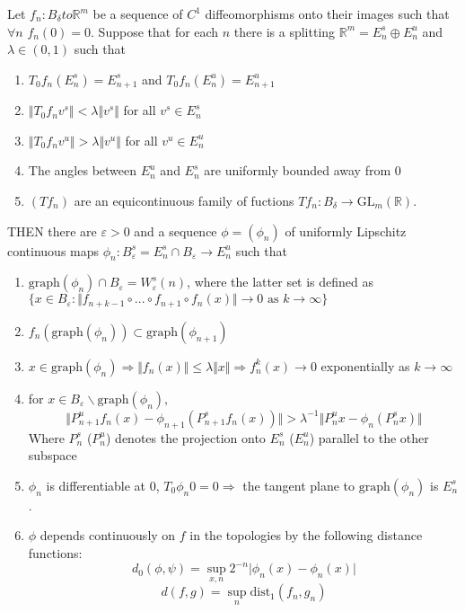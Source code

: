 \begin{prop}

Let $f_n: B_{\delta} to \mathbb{R}^m$ be a sequence of $C^1$ diffeomorphisms onto their images such that $\forall n \hspace{4pt} f_n(0)=0$. Suppose that for each $n$ there is a splitting $\mathbb{R}^m=E^s_n \oplus E^u_n$ and $\lambda \in (0,1)$ such that

\begin{enumerate}
    \item $T_0f_n (E^s_n) = E^s_{n+1}$ and $T_0f_n(E^u_n)=E^u_{n+1}$
    \item $\Vert T_0f_n v^s \Vert < \lambda \Vert v^s \Vert$ for all $v^s \in E^s_n$
    \item $\Vert T_0f_n v^u \Vert > \lambda \Vert v^u \Vert $ for all $v^u \in E^u_n$
    \item The angles between $E^u_n$ and $E^s_n$ are uniformly bounded away from 0
    \item $(Tf_n)$ are an equicontinuous family of fuctions $Tf_n: B_{\delta} \to \mathrm{GL}_m(\mathbb{R})$.
\end{enumerate}
THEN there are $\varepsilon > 0$ and a sequence $\phi = (\phi_n)$ of uniformly Lipschitz continuous maps $\phi_n:B^s_{\varepsilon} = E^s_n \cap B_{\varepsilon} \to E^u_n$ such that

\begin{enumerate}
    \item $\mathrm{graph}(\phi_n) \cap B_{\varepsilon} = W^s_{\varepsilon}(n)$, where the latter set is defined as $\{ x \in B_{\varepsilon}: \Vert f_{n+k-1} \circ ... \circ f_{n+1} \circ f_n(x) \Vert \to 0 \text{ as } k \to \infty \}$
    \item $f_n(\mathrm{graph}(\phi_n)) \subset \mathrm{graph}(\phi_{n+1})$
    \item $x \in \mathrm{graph}(\phi_n) \Rightarrow \Vert f_n(x) \Vert \leq \lambda \Vert x \Vert \Rightarrow f^k_n(x) \to 0$ exponentially as $k \to \infty$
    \item for $x \in B_{\varepsilon} \backslash \mathrm{graph}(\phi_n),$
    \[
    \Vert P^u_{n+1} f_n(x) - \phi_{n+1} \left( P^s_{n+1} f_n(x) \right) \Vert > \lambda^{-1} \Vert P^u_nx - \phi_n \left( P^s_nx \right) \Vert
    \]
    Where $P^s_n$ ($P^u_n$) denotes the projection onto $E^s_n$ ($E^u_n$) parallel to the other subspace
    \item $\phi_n$ is differentiable at 0, $T_0\phi_n 0 = 0 \Rightarrow$ the tangent plane to $\mathrm{graph}(\phi_n)$ is $E^s_n$.
    \item $\phi$ depends continuously on $f$ in the topologies by the following distance functions:
    \[d_0(\phi,\psi) = \sup_{x,n} 2^{-n} \vert \phi_n(x) - \phi_n(x) \vert\]
    \[d(f,g) = \sup_{n} \mathrm{dist}_1(f_n, g_n)\]
    
\end{enumerate}
\end{prop}

